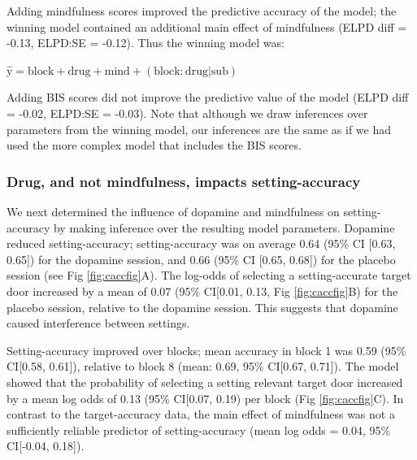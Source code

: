 \documentclass[
  man]{apa6}
\begin{document}
Adding mindfulness scores improved the predictive accuracy of the model; the winning model contained an additional main effect of mindfulness (ELPD diff = -0.13, ELPD:SE = -0.12). Thus the winning model was:

\(\mathrm{\hat{y}} = \mathrm{block} + \mathrm{drug} + \mathrm{mind} + \mathrm{(block:drug|sub)}\)

Adding BIS scores did not improve the predictive value of the model (ELPD diff = -0.02, ELPD:SE = -0.03). Note that although we draw inferences over parameters from the winning model, our inferences are the same as if we had used the more complex model that includes the BIS scores.

\hypertarget{drug-and-not-mindfulness-impacts-setting-accuracy}{%
\subsubsection{Drug, and not mindfulness, impacts setting-accuracy}\label{drug-and-not-mindfulness-impacts-setting-accuracy}}

We next determined the influence of dopamine and mindfulness on setting-accuracy by making inference over the resulting model parameters. Dopamine reduced setting-accuracy; setting-accuracy was on average 0.64 (95\% CI {[}0.63, 0.65{]}) for the dopamine session, and 0.66 (95\% CI {[}0.65, 0.68{]}) for the placebo session (see Fig \ref{fig:caccfig}A). The log-odds of selecting a setting-accurate target door increased by a mean of 0.07 (95\% CI{[}0.01, 0.13, Fig \ref{fig:caccfig}B) for the placebo session, relative to the dopamine session. This suggests that dopamine caused interference between settings.

Setting-accuracy improved over blocks; mean accuracy in block 1 was 0.59 (95\% CI{[}0.58, 0.61{]}), relative to block 8 (mean: 0.69, 95\% CI{[}0.67, 0.71{]}). The model showed that the probability of selecting a setting relevant target door increased by a mean log odds of 0.13 (95\% CI{[}0.07, 0.19) per block (Fig \ref{fig:caccfig}C). In contrast to the target-accuracy data, the main effect of mindfulness was not a sufficiently reliable predictor of setting-accuracy (mean log odds = 0.04, 95\% CI{[}-0.04, 0.18{]}).
\end{document}
